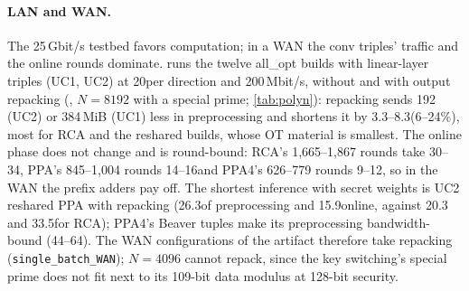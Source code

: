 \paragraph{LAN and WAN.} The 25\,Gbit/s testbed favors computation; in a WAN the conv triples' traffic and the online
rounds dominate.  runs the twelve all\_opt builds with linear-layer triples (UC1, UC2) at 20\ms per
direction and 200\,Mbit/s, without and with output repacking (, $N = 8192$ with a special
prime; \cref{tab:polyn}): repacking sends 192 (UC2) or 384\,MiB (UC1) less in preprocessing and
shortens it by 3.3--8.3\s (6--24\%), most for RCA and the reshared builds, whose OT material is smallest. The online
phase does not change and is round-bound: RCA's 1,665--1,867 rounds take 30--34\s, PPA's 845--1,004 rounds 14--16\s and
PPA4's 626--779 rounds 9--12\s, so in the WAN the prefix adders pay off. The shortest inference with secret weights is UC2
reshared PPA with repacking (26.3\s of preprocessing and 15.9\s online, against 20.3 and 33.5\s for RCA); PPA4's Beaver
tuples make its preprocessing bandwidth-bound (44--64\s). The WAN configurations of the artifact therefore take
repacking (\texttt{single\_batch\_WAN}); $N = 4096$ cannot repack, since the key switching's special prime does not fit
next to its 109-bit data modulus at 128-bit security.

